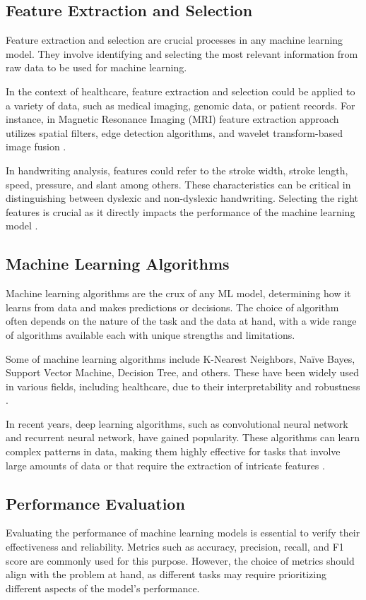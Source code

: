 \newpage
\subsection{Feature Extraction and Selection}
Feature extraction and selection are crucial processes in any machine learning model. They involve identifying and selecting the most relevant information from raw data to be used for machine learning.

In the context of healthcare, feature extraction and selection could be applied to a variety of data, such as medical imaging, genomic data, or patient records. For instance, in Magnetic Resonance Imaging (MRI) feature extraction approach utilizes spatial filters, edge detection algorithms, and wavelet transform-based image fusion \parencite{Udomhunsakul}.

In handwriting analysis, features could refer to the stroke width, stroke length, speed, pressure, and slant among others. These characteristics can be critical in distinguishing between dyslexic and non-dyslexic handwriting. Selecting the right features is crucial as it directly impacts the performance of the machine learning model \parencite{Arif2015}.\\

\newpage
\subsection{Machine Learning Algorithms}
Machine learning algorithms are the crux of any ML model, determining how it learns from data and makes predictions or decisions. The choice of algorithm often depends on the nature of the task and the data at hand, with a wide range of algorithms available each with unique strengths and limitations.

Some of machine learning algorithms include K-Nearest Neighbors, Naïve Bayes, Support Vector Machine, Decision Tree, and others. These have been widely used in various fields, including healthcare, due to their interpretability and robustness \parencite{Ray2019}.

In recent years, deep learning algorithms, such as convolutional neural network and recurrent neural network, have gained popularity. These algorithms can learn complex patterns in data, making them highly effective for tasks that involve large amounts of data or that require the extraction of intricate features \parencite{Pamina2019SurveyOD}.\\

\newpage
\subsection{Performance Evaluation}
Evaluating the performance of machine learning models is essential to verify their effectiveness and reliability. Metrics such as accuracy, precision, recall, and F1 score are commonly used for this purpose. However, the choice of metrics should align with the problem at hand, as different tasks may require prioritizing different aspects of the model's performance.

